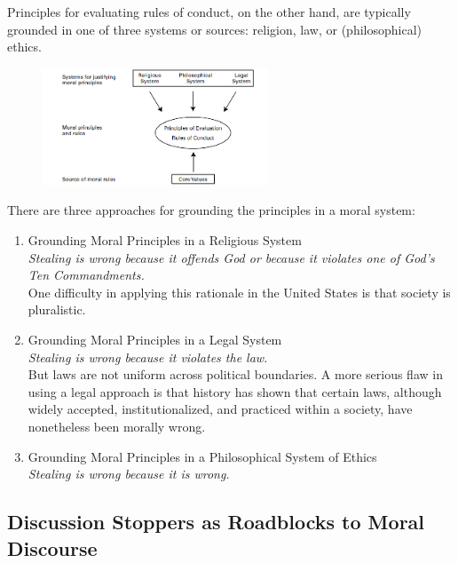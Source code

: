 \documentclass[12pt]{article}
\theoremstyle{definition}
\begin{document}
Principles for evaluating rules of conduct, on the other hand, are typically grounded in
one of three systems or sources: religion, law, or (philosophical) ethics.
\begin{figure}
\centering
\includegraphics[width=0.6\textwidth]{2.png}
\end{figure}
There are three approaches for grounding the principles in a moral system:
\begin{enumerate}[label=Approach \arabic*:]
\item Grounding Moral Principles in a Religious System\\\textit{Stealing is wrong because it offends God or because it violates one of God’s Ten Commandments.}\\One difficulty in applying this rationale in the United States is that society is pluralistic. 
\item Grounding Moral Principles in a Legal System\\\textit{Stealing is wrong because it violates the law.}\\But laws are not uniform across political boundaries. A more serious flaw in using a legal approach is that history has shown that certain laws, although widely accepted, institutionalized, and practiced within a society, have nonetheless been morally wrong.
\item Grounding Moral Principles in a Philosophical System of Ethics\\\textit{Stealing is wrong because it is wrong.}
\end{enumerate}
\subsection{Discussion Stoppers as Roadblocks to Moral Discourse}
\end{document}
